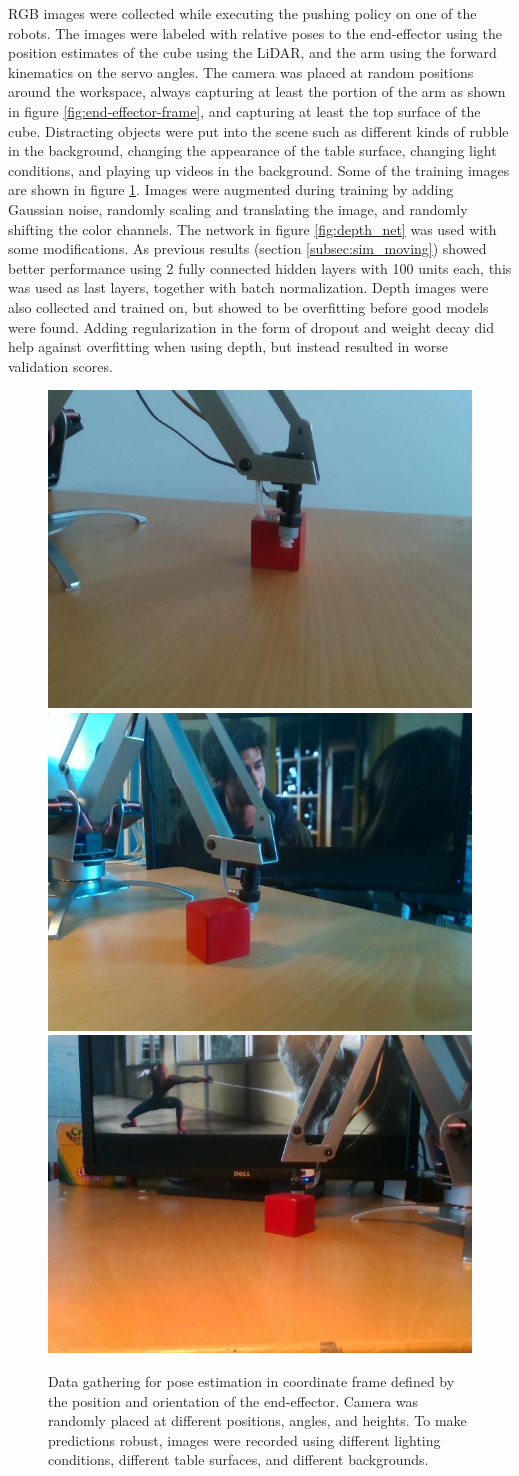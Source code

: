 RGB images were collected while executing the pushing policy on one of the
robots. The images were labeled with relative poses to the end-effector using
the position estimates of the cube using the LiDAR, and the arm using the
forward kinematics on the servo angles. The camera was placed at random
positions around the workspace, always capturing at least the portion of the
arm as shown in figure \ref{fig:end-effector-frame}, and capturing at least the
top surface of the cube. Distracting objects were put into the scene such as
different kinds of rubble in the background, changing the appearance of the
table surface, changing light conditions, and playing up videos in the
background. Some of the training images are shown in figure
\ref{fig:relpose-training-data}. Images were augmented during training by
adding Gaussian noise, randomly scaling and translating the image, and randomly
shifting the color channels. The network in figure \ref{fig:depth_net} was used
with some modifications. As previous results (section \ref{subsec:sim_moving})
showed better performance using 2 fully connected hidden layers with 100 units
each, this was used as last layers, together with batch normalization. Depth
images were also collected and trained on, but showed to be overfitting before
good models were found. Adding regularization in the form of dropout and weight
decay did help against overfitting when using depth, but instead resulted in
worse validation scores.

\begin{figure}[h!]
    \centering
    \includegraphics[width=0.3 \textwidth]{res/spiderman1.jpg}
    \includegraphics[width=0.3 \textwidth]{res/spiderman2.jpg}
    \includegraphics[width=0.3 \textwidth]{res/spiderman3.jpg}

    \caption{Data gathering for pose estimation in coordinate frame defined by
    the position and orientation of the end-effector. Camera was randomly
    placed at different positions, angles, and heights. To make predictions
    robust, images were recorded using different lighting conditions, different
    table surfaces, and different backgrounds.}

    \label{fig:relpose-training-data}
    
\end{figure}

